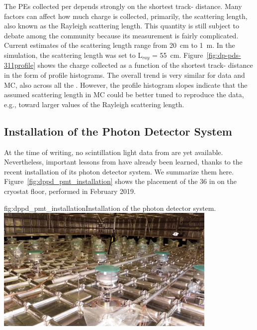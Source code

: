 
The PEs collected per  depends strongly on the shortest track- distance. Many factors can affect how much charge is collected, primarily, the scattering length, also known as the Rayleigh scattering length. This quantity is still subject to debate among the  community because its measurement is fairly complicated. Current estimates of the scattering length range from \SI{20}{\cm} to \SI{1}{\m}.
In the  simulation, the scattering length was set to L$_{ray}$ = \SI{55}{\cm}.
Figure~\ref{fig:dp-pds-311profile} shows the charge collected as a function of the shortest track- distance in the form of profile histograms. The overall trend is very similar for data and MC, also across all the . However, the profile histogram slopes indicate that the assumed scattering length in MC could be better tuned to reproduce the data, e.g., toward larger values of the Rayleigh scattering length.


\subsection{Installation of the  Photon Detector System}

At the time of writing, no scintillation light data from  are yet available. Nevertheless, important lessons from  have already been learned, thanks to the recent installation of its photon detector system. We summarize them here. Figure~\ref{fig:dppd_pmt_installation} shows the placement of the \num{36}  in  on the cryostat floor, performed in February 2019.

\begin{dunefigure}{fig:dppd_pmt_installation}{Installation of the  photon detector system.}
\includegraphics[width=0.8\textwidth]{graphics/dppd_pmt_installation.jpg}
\end{dunefigure}


